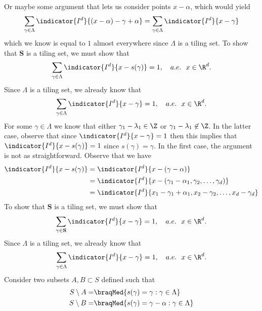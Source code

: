 Or maybe some argument that lets us consider points $x-\alpha$, which would yield
\begin{align*}
    \sum_{\gamma \in \Lambda} \indicator{I^d}{(x-\alpha) - \gamma + \alpha} = \sum_{\gamma \in \Lambda} \indicator{I^d}{x - \gamma}
\end{align*}
which we know is equal to $1$ almost everywhere since $\Lambda$ is a tiling set. 
To show that $\mathbf{S}$ is a tiling set, we must show that
\begin{equation*}
    \sum_{\gamma \in \Lambda} \indicator{I^d}{x-s(\gamma)} = 1, \quad a.e. \text{\space\space} x \in \R^d.
\end{equation*}
Since $\Lambda$ is a tiling set, we already know that
\begin{equation*}
    \sum_{\gamma \in \Lambda} \indicator{I^d}{x-\gamma} = 1, \quad a.e. \text{\space\space} x \in \R^d.
\end{equation*}
For some $\gamma\in \Lambda$ we know that either $\gamma_1-\lambda_1 \in \Z$ or $\gamma_1-\lambda_1 \not\in \Z$. In the latter case, observe that since
$\indicator{I^d}{x-\gamma} = 1$ then this implies that $\indicator{I^d}{x-s(\gamma)} = 1$ since $s(\gamma) = \gamma$. In the first case, the argument is not as straightforward. Observe that we have
\begin{align*}
    \indicator{I^d}{x-s(\gamma)} &= \indicator{I^d}{x- (\gamma-\alpha)}\\
    &= \indicator{I^d}{x- (\gamma_1-\alpha_1,\gamma_2,\dots,\gamma_d)}\\
    &= \indicator{I^d}{x_1-\gamma_1+\alpha_1,x_2- \gamma_2,\dots,x_d-\gamma_d}\\
\end{align*}
To show that $\mathbf{S}$ is a tiling set, we must show that
\begin{equation*}
    \sum_{\gamma \in \mathbf{S}} \indicator{I^d}{x-\gamma} = 1, \quad a.e. \text{\space\space} x \in \R^d.
\end{equation*}
Since $\Lambda$ is a tiling set, we already know that
\begin{equation*}
    \sum_{\gamma \in \Lambda} \indicator{I^d}{x-\gamma} = 1, \quad a.e. \text{\space\space} x \in \R^d.
\end{equation*}
Consider two subsets $A, B \subset S$ defined such that 
\begin{align*}
    S\setminus A =& \braqMed{s(\gamma) = \gamma : \gamma \in \Lambda}\\
    S\setminus B =& \braqMed{s(\gamma) = \gamma - \alpha : \gamma \in \Lambda}
\end{align*}
